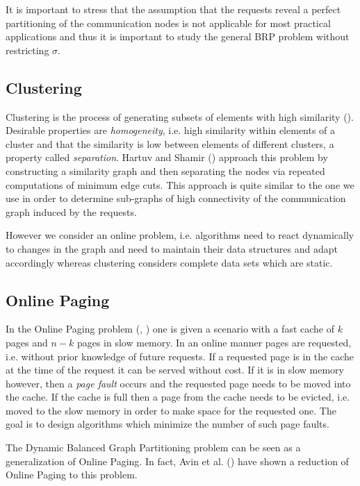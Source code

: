 \documentclass[a4paper,xcolor=dvipsnames, tikz, 12pt]{article}
\theoremstyle{definition}
\begin{document}
	It is important to stress that the assumption that the requests reveal a perfect partitioning of the communication nodes is not applicable for most practical applications and thus it is important to study the general BRP problem without restricting $\sigma$.
	
	
	\subsection{Clustering}
	
	Clustering is the process of generating subsets of elements with high similarity (\cite{Hartuv2000}). Desirable properties are \textit{homogeneity}, i.e. high similarity within elements of a cluster and that the similarity is low between elements of different clusters, a property called \textit{separation}. Hartuv and Shamir (\cite{Hartuv2000}) approach this problem by constructing a similarity graph and then separating the nodes via repeated computations of minimum edge cuts. This approach is quite similar to the one we use in order to determine sub-graphs of high connectivity of the communication graph induced by the requests.
	
	However we consider an online problem, i.e. algorithms need to react dynamically to changes in the graph and need to maintain their data structures and adapt accordingly whereas clustering considers complete data sets which are static.
	

	\subsection{Online Paging}
	In the Online Paging problem (\cite{Fiat2002}, \cite{Epstein2011}) one is given a scenario with a fast cache of $k$ pages and $n-k$ pages in slow memory. In an online manner pages are requested, i.e. without prior knowledge of future requests. If a requested page is in the cache at the time of the request it can be served without cost. If it is in slow memory however, then a \textit{page fault} occurs and the requested page needs to be moved into the cache. If the cache is full then a page from the cache needs to be evicted, i.e. moved to the slow memory in order to make space for the requested one. The goal is to design algorithms which minimize the number of such page faults. 
	
	The Dynamic Balanced Graph Partitioning problem can be seen as a generalization of Online Paging. In fact, Avin et al. (\cite{Avin2015}) have shown a reduction of Online Paging to this problem.
	
\end{document}
